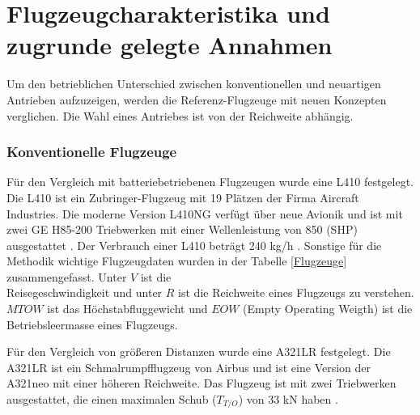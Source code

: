 \section{Flugzeugcharakteristika und zugrunde gelegte Annahmen}
\label{ss:Relevante Flugzeugdaten}
%
Um den betrieblichen Unterschied zwischen konventionellen und neuartigen Antrieben aufzuzeigen, 
werden die Referenz-Flugzeuge mit neuen Konzepten verglichen. 
Die Wahl eines Antriebes ist von der Reichweite abhängig.\\
%
\subsubsection{Konventionelle Flugzeuge}
%
Für den Vergleich mit batteriebetriebenen Flugzeugen wurde eine L410 festgelegt. 
Die L410 ist ein Zubringer-Flugzeug mit 19 Plätzen der Firma Aircraft Industries. 
Die moderne Version L410NG verfügt über neue Avionik und ist mit zwei GE H85-200 Triebwerken 
mit einer Wellenleistung von 850 (SHP) ausgestattet \cite{GEAerospace_H85_2025}.
Der Verbrauch einer L410 beträgt 240 kg/h \cite{let2016l410}. 
Sonstige für die Methodik wichtige Flugzeugdaten wurden in der Tabelle \ref{Flugzeuge} zusammengefasst.
Unter $V$ ist die \\ Reisegeschwindigkeit und unter $R$ ist die Reichweite eines Flugzeugs zu verstehen. 
$MTOW$ ist das Höchstabfluggewicht und $EOW$ (Empty Operating Weigth) ist die Betriebsleermasse eines Flugzeugs.

Für den Vergleich von größeren Distanzen wurde eine A321LR festgelegt. 
Die A321LR ist ein Schmalrumpfflugzeug von Airbus und ist eine 
Version der A321neo mit einer höheren Reichweite.
Das Flugzeug ist mit zwei Triebwerken ausgestattet, 
die einen maximalen Schub ($T_{T/O}$) von 33 kN haben \cite{eurocontrol_a321}.

